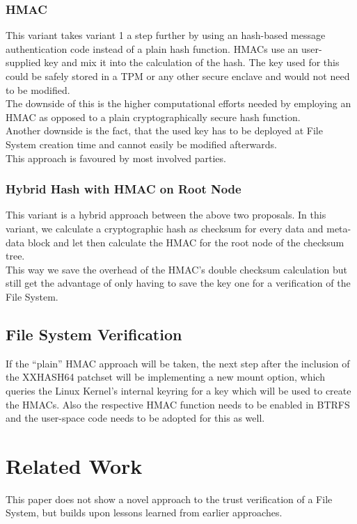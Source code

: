\documentclass[10pt]{article}
\begin{document}
\subsubsection{HMAC}
This variant takes variant 1 a step further by using an hash-based message
authentication code \cite{HMAC} instead of a plain hash function. HMACs use an
user-supplied key and mix it into the calculation of the hash. The key used
for this could be safely stored in a TPM or any other secure enclave and would
not need to be modified.\\
The downside of this is the higher computational efforts needed by employing
an HMAC as opposed to a plain cryptographically secure hash function.\\
Another downside is the fact, that the used key has to be deployed at
File System creation time and cannot easily be modified afterwards.\\
This approach is favoured by most involved parties.

\subsubsection{Hybrid Hash with HMAC on Root Node}
This variant is a hybrid approach between the above two proposals. In this
variant, we calculate a cryptographic hash as checksum for every data and
meta-data block and let then calculate the HMAC for the root node of the
checksum tree.\\ This way we save the overhead of the HMAC's double checksum
calculation but still get the advantage of only having to save the key one for
a verification of the File System.

\subsection{File System Verification}
If the ``plain'' HMAC approach will be taken, the next step after the inclusion
of the XXHASH64 patchset will be implementing a new mount option, which
queries the Linux Kernel's internal keyring for a key which will be used to
create the HMACs. Also the respective HMAC function needs to be enabled in
BTRFS and the user-space code needs to be adopted for this as well.

\section{Related Work}
This paper does not show a novel approach to the trust verification of a 
File System, but builds upon lessons learned from earlier approaches.
\end{document}
